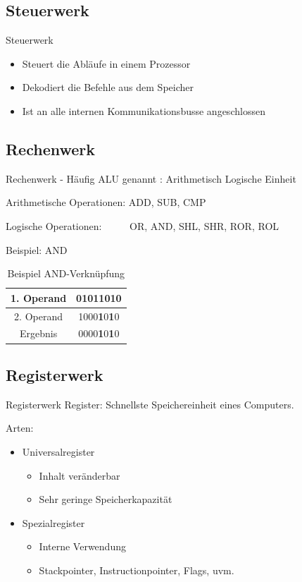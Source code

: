\documentclass{beamer}
\begin{document}
\subsection{Steuerwerk}
\begin{frame}{Steuerwerk}
\begin{itemize}


\item{Steuert die Abl\"aufe in einem Prozessor}
\bigskip
\item{Dekodiert die Befehle aus dem Speicher}
\bigskip
\item{Ist an alle internen Kommunikationsbusse angeschlossen}
\end{itemize}
\end{frame}



\subsection{Rechenwerk}
\begin{frame}[t]{Rechenwerk}
- H\"aufig ALU genannt : Arithmetisch Logische Einheit \par \bigskip
Arithmetische Operationen: ADD, SUB, CMP\newline\par
Logische Operationen: \ \ \ \ \ OR, AND, SHL, SHR, ROR, ROL \par
\pause\bigskip
Beispiel: AND 
\begin{table}[]
\begin{tabular}{|c|c|}
\hline
1. Operand & 0101\textbf{1}0\textbf{1}0 \\ \hline
2. Operand & 1000\textbf{1}0\textbf{1}0 \\ \hline\hline
Ergebnis   & 0000\textbf{1}0\textbf{1}0 \\ \hline
\end{tabular}
\centering
\caption{Beispiel AND-Verkn\"upfung}
\end{table}
\end{frame}


\subsection{Registerwerk}
\begin{frame}[t]{Registerwerk}
Register: Schnellste Speichereinheit eines Computers.
\par\smallskip
Arten:
\begin{itemize}
\item Universalregister
\begin{itemize}
\item Inhalt ver\"anderbar
\item Sehr geringe Speicherkapazit\"at
\smallskip
\end{itemize}
\item Spezialregister
\begin{itemize}
\item Interne Verwendung
\item Stackpointer, Instructionpointer, Flags, uvm.
\end{itemize}
\end{itemize}
\end{frame}
\end{document}
